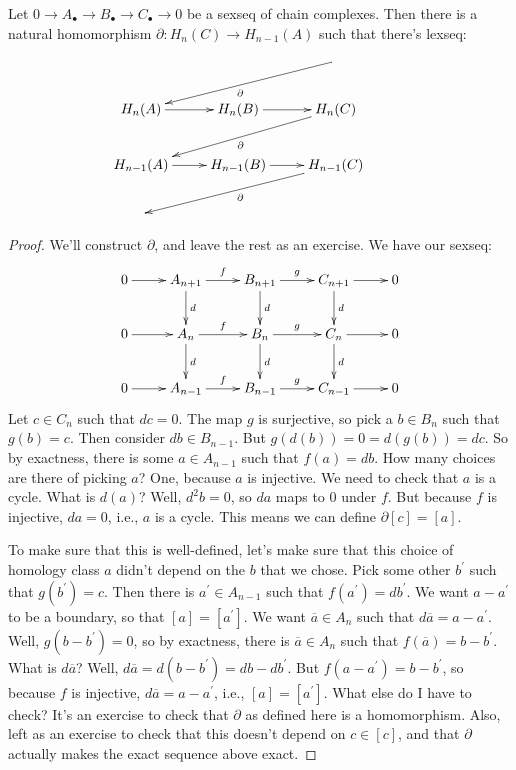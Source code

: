 \begin{theorem}
Let $0\to A_\bullet\to B_\bullet\to C_\bullet\to 0$ be a sexseq of chain complexes. Then there is a natural homomorphism $\partial: H_n(C)\to H_{n-1}(A)$ such that there's lexseq:
\begin{equation*}
\xymatrix{ & & \ar[dll]^\partial\\
 H_n(A)\ar[r] & H_n(B)\ar[r] & H_n(C)\ar[dll]^\partial\\
 H_{n-1}(A)\ar[r] & H_{n-1}(B)\ar[r] & H_{n-1}(C)\ar[dll]^\partial\\
 & & &}
\end{equation*}
\end{theorem}
\begin{proof}
We'll construct $\partial$, and leave the rest as an exercise. We have our sexseq:
\begin{equation*}
\xymatrix{0\ar[r] & A_{n+1}\ar[r]^f\ar[d]^d & B_{n+1}\ar[r]^g\ar[d]^d & C_{n+1}\ar[r]\ar[d]^d & 0\\
0\ar[r] & A_n\ar[r]^f\ar[d]^d & B_n\ar[r]^g\ar[d]^d & C_n\ar[r]\ar[d]^d & 0\\
0\ar[r] & A_{n-1}\ar[r]^f & B_{n-1}\ar[r]^g & C_{n-1}\ar[r] & 0}
\end{equation*}
Let $c\in C_n$ such that $dc=0$. The map $g$ is surjective, so pick a $b\in B_n$ such that $g(b)=c$. Then consider $db\in B_{n-1}$. But $g(d(b))=0=d(g(b))=dc$. So by exactness, there is some $a\in A_{n-1}$ such that $f(a)=db$. How many choices are there of picking $a$? One, because $a$ is injective. We need to check that $a$ is a cycle. What is $d(a)$? Well, $d^2b=0$, so $da$ maps to $0$ under $f$. But because $f$ is injective, $da=0$, i.e., $a$ is a cycle. This means we can define $\partial[c]=[a]$.

To make sure that this is well-defined, let's make sure that this choice of homology class $a$ didn't depend on the $b$ that we chose. Pick some other $b^\prime$ such that $g(b^\prime)=c$. Then there is $a^\prime\in A_{n-1}$ such that $f(a^\prime)=db^\prime$. We want $a-a^\prime$ to be a boundary, so that $[a]=[a^\prime]$. We want $\overline{a}\in A_n$ such that $d\overline{a}=a-a^\prime$. Well, $g(b-b^\prime)=0$, so by exactness, there is $\overline{a}\in A_n$ such that $f(\overline{a})=b-b^\prime$. What is $d\overline{a}$? Well, $d\overline{a}=d(b-b^\prime)=db-db^\prime$. But $f(a-a^\prime)=b-b^\prime$, so because $f$ is injective, $d\overline{a}=a-a^\prime$, i.e., $[a]=[a^\prime]$. What else do I have to check? It's an exercise to check that $\partial$ as defined here is a homomorphism. Also, left as an exercise to check that this doesn't depend on $c\in[c]$, and that $\partial$ actually makes the exact sequence above exact.
\end{proof}
